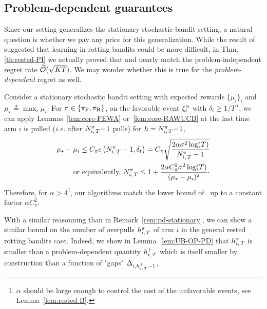 \subsection{Problem-dependent guarantees}
\label{ss:rested-PD}
Since our setting generalizes the stationary stochastic bandit setting, a natural question is whether we pay any price for this generalization. While the result of~\citet{levine2017rotting} suggested that learning in rotting bandits could be more difficult, in Thm.\,\ref{th:rested-PI} we actually proved that \FEWA and \RUCB nearly match the problem-independent regret rate $\widetilde{\mathcal{O}}(\sqrt{KT})$. We may wonder whether this is true for the \emph{problem-dependent} regret as well.

\begin{remark}\label{rem:pd-stationary}
Consider a stationary stochastic bandit setting with expected rewards $\{\mu_i\}_i $ and $\mu_\star \triangleq \max_i \mu_i$. For $\pi \in \left\{\pi_{\rm F}, \pi_{\rm R}\right\}$, on the favorable event $\xi^\alpha_t$ with $\delta_t \geq 1/T^\alpha$,  we can apply Lemmas~\ref{lem:core-FEWA} or~\ref{lem:core-RAWUCB} at the last time arm $i$ is pulled (\emph{i.e.} after $N_{i,\,T}^\pi\!-\!1$ pulls) for $h = N_{i,\,T}^\pi\!-\!1$, 
\begin{align}
\mu_\star - \mu_i \leq C_\pi c\left(N_{i,\,T}^\pi-1,  \delta_t\right) = C_\pi\sqrt{\frac{2\alpha\sigma^2 \log(T)}{N_{i,\,T}^\pi -1}}
\nonumber\\
\text{\ or equivalently,\ }
\label{eq:LaiRob}
N_{i,\,T}^\pi \leq 1+ \frac{2\alpha C_\pi^2 \sigma^2 \log(T)}{(\mu_{\star} - \mu_i) ^2}\cdot
\end{align}
Therefore, for $\alpha > 4$\footnote{$\alpha$ should be large enough to control the cost of the unfavorable events, see Lemma~\ref{lem:rested-B}.}, our algorithms match the lower bound of~\citet{lai1985asymptotically} up to a constant factor $\alpha C_\pi^2$.
\end{remark}

With a similar reasonning than in Remark~\ref{rem:pd-stationary}, we can show a similar bound on the number of overpulls $h_{i,\,T}^\pi$  of arm $i$ in the general rested rotting bandits case. Indeed, we show in Lemma~\ref{lem:UB-OP-PD} that $h_{i,\,T}^\pi$ is smaller than a problem-dependent quantity $h_{i,\,T}^+$ which is itself smaller by construction than a function of "gaps" $\Delta_{i,h_{i,\,T}^+-1}$,

